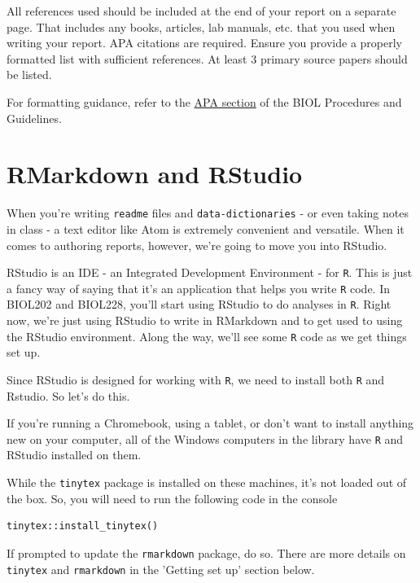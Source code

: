 \documentclass[
]{book}
\begin{document}
All references used should be included at the end of your report on a separate page. That includes any books, articles, lab manuals, etc. that you used when writing your report. APA citations are required. Ensure you provide a properly formatted list with sufficient references. At least 3 primary source papers should be listed.

For formatting guidance, refer to the \href{https://ubco-biology.github.io/Procedures-and-Guidelines/apa-citations.html}{APA section} of the BIOL Procedures and Guidelines.

\hypertarget{rmarkdown-and-rstudio}{%
\section*{RMarkdown and RStudio}\label{rmarkdown-and-rstudio}}

When you're writing \texttt{readme} files and \texttt{data-dictionaries} - or even taking notes in class - a text editor like Atom is extremely convenient and versatile. When it comes to authoring reports, however, we're going to move you into RStudio.

RStudio is an IDE - an Integrated Development Environment - for \texttt{R}. This is just a fancy way of saying that it's an application that helps you write \texttt{R} code. In BIOL202 and BIOL228, you'll start using RStudio to do analyses in \texttt{R}. Right now, we're just using RStudio to write in RMarkdown and to get used to using the RStudio environment. Along the way, we'll see some \texttt{R} code as we get things set up.

Since RStudio is designed for working with \texttt{R}, we need to install both \texttt{R} and Rstudio. So let's do this.

If you're running a Chromebook, using a tablet, or don't want to install anything new on your computer, all of the Windows computers in the library have \texttt{R} and RStudio installed on them.

While the \texttt{tinytex} package is installed on these machines, it's not loaded out of the box. So, you will need to run the following code in the console

\begin{verbatim}
tinytex::install_tinytex()
\end{verbatim}

If prompted to update the \texttt{rmarkdown} package, do so. There are more details on \texttt{tinytex} and \texttt{rmarkdown} in the 'Getting set up' section below.
\end{document}
